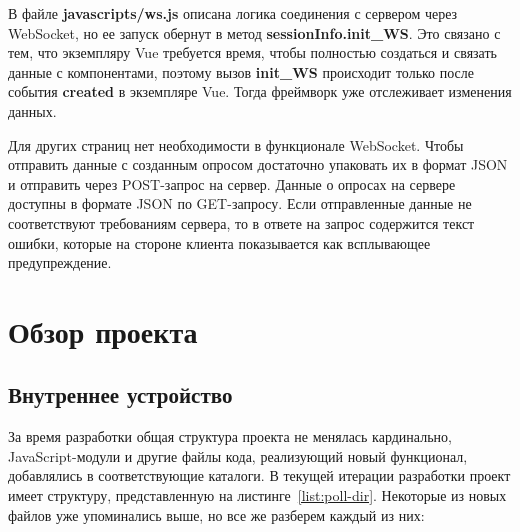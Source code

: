 В файле \textbf{javascripts/ws.js} описана логика соединения с сервером через WebSocket, но ее запуск обернут в метод  
\textbf{sessionInfo.init\_WS}. Это связано с тем, что экземпляру Vue требуется время, чтобы полностью создаться и связать данные с компонентами, поэтому вызов \textbf{init\_WS} происходит только после события \textbf{created} в экземпляре Vue. Тогда фреймворк уже отслеживает изменения данных.
 
Для других страниц нет необходимости в функционале WebSocket. Чтобы отправить данные с созданным опросом достаточно упаковать их в формат JSON и отправить через POST-запрос на сервер. Данные о опросах на сервере доступны в формате JSON по GET-запросу. Если  отправленные данные не соответствуют требованиям сервера, то в ответе на запрос содержится текст ошибки, которые на стороне клиента показывается как всплывающее предупреждение.        

\newpage
\section{Обзор проекта}
\subsection{Внутреннее устройство}
За время разработки общая структура проекта не менялась кардинально, JavaScript-модули и другие файлы кода, реализующий новый функционал, добавлялись в соответствующие каталоги. В текущей итерации разработки проект имеет структуру, представленную на листинге~\ref{list:poll-dir}. Некоторые из новых файлов уже упоминались выше, но все же разберем каждый из них:

